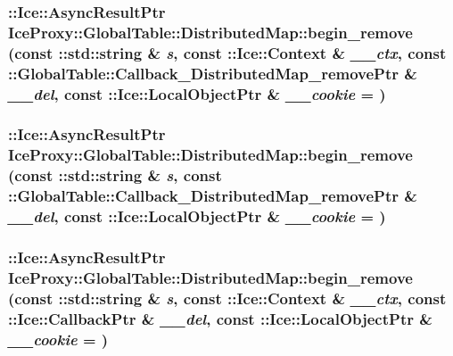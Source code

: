 \label{class_ice_proxy_1_1_global_table_1_1_distributed_map_a2ce9fb426f365390f7b3befb0e77bdbb}
\hypertarget{class_ice_proxy_1_1_global_table_1_1_distributed_map_af68e96e1483125167f8d6a0e962373bd}{
\subsubsection[{begin\_\-remove}]{\setlength{\rightskip}{0pt plus 5cm}::Ice::AsyncResultPtr IceProxy::GlobalTable::DistributedMap::begin\_\-remove (const ::std::string \& {\em s}, \/  const ::Ice::Context \& {\em \_\-\_\-ctx}, \/  const ::{\bf GlobalTable::Callback\_\-DistributedMap\_\-removePtr} \& {\em \_\-\_\-del}, \/  const ::Ice::LocalObjectPtr \& {\em \_\-\_\-cookie} = {})}}
\label{class_ice_proxy_1_1_global_table_1_1_distributed_map_af68e96e1483125167f8d6a0e962373bd}
\hypertarget{class_ice_proxy_1_1_global_table_1_1_distributed_map_a73ca90ed2e6c33812eb9fa967da6caaf}{
\subsubsection[{begin\_\-remove}]{\setlength{\rightskip}{0pt plus 5cm}::Ice::AsyncResultPtr IceProxy::GlobalTable::DistributedMap::begin\_\-remove (const ::std::string \& {\em s}, \/  const ::{\bf GlobalTable::Callback\_\-DistributedMap\_\-removePtr} \& {\em \_\-\_\-del}, \/  const ::Ice::LocalObjectPtr \& {\em \_\-\_\-cookie} = {})}}
\label{class_ice_proxy_1_1_global_table_1_1_distributed_map_a73ca90ed2e6c33812eb9fa967da6caaf}
\hypertarget{class_ice_proxy_1_1_global_table_1_1_distributed_map_a479d4d5d16d3d2f83c24a848cb5757f2}{
\subsubsection[{begin\_\-remove}]{\setlength{\rightskip}{0pt plus 5cm}::Ice::AsyncResultPtr IceProxy::GlobalTable::DistributedMap::begin\_\-remove (const ::std::string \& {\em s}, \/  const ::Ice::Context \& {\em \_\-\_\-ctx}, \/  const ::Ice::CallbackPtr \& {\em \_\-\_\-del}, \/  const ::Ice::LocalObjectPtr \& {\em \_\-\_\-cookie} = {})}}
